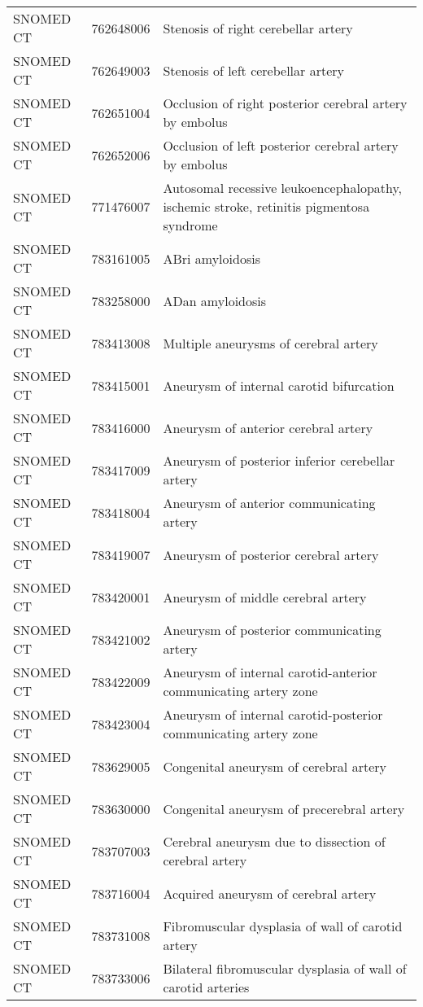 \begin{longtable}{p{}p{}p{}}
  SNOMED CT & 762648006 & Stenosis of right cerebellar artery \\ 
  SNOMED CT & 762649003 & Stenosis of left cerebellar artery \\ 
  SNOMED CT & 762651004 & Occlusion of right posterior cerebral artery by embolus \\ 
  SNOMED CT & 762652006 & Occlusion of left posterior cerebral artery by embolus \\ 
  SNOMED CT & 771476007 & Autosomal recessive leukoencephalopathy, ischemic stroke, retinitis pigmentosa syndrome \\ 
  SNOMED CT & 783161005 & ABri amyloidosis \\ 
  SNOMED CT & 783258000 & ADan amyloidosis \\ 
  SNOMED CT & 783413008 & Multiple aneurysms of cerebral artery \\ 
  SNOMED CT & 783415001 & Aneurysm of internal carotid bifurcation \\ 
  SNOMED CT & 783416000 & Aneurysm of anterior cerebral artery \\ 
  SNOMED CT & 783417009 & Aneurysm of posterior inferior cerebellar artery \\ 
  SNOMED CT & 783418004 & Aneurysm of anterior communicating artery \\ 
  SNOMED CT & 783419007 & Aneurysm of posterior cerebral artery \\ 
  SNOMED CT & 783420001 & Aneurysm of middle cerebral artery \\ 
  SNOMED CT & 783421002 & Aneurysm of posterior communicating artery \\ 
  SNOMED CT & 783422009 & Aneurysm of internal carotid-anterior communicating artery zone \\ 
  SNOMED CT & 783423004 & Aneurysm of internal carotid-posterior communicating artery zone \\ 
  SNOMED CT & 783629005 & Congenital aneurysm of cerebral artery \\ 
  SNOMED CT & 783630000 & Congenital aneurysm of precerebral artery \\ 
  SNOMED CT & 783707003 & Cerebral aneurysm due to dissection of cerebral artery \\ 
  SNOMED CT & 783716004 & Acquired aneurysm of cerebral artery \\ 
  SNOMED CT & 783731008 & Fibromuscular dysplasia of wall of carotid artery \\ 
  SNOMED CT & 783733006 & Bilateral fibromuscular dysplasia of wall of carotid arteries \\ 

\end{longtable}
